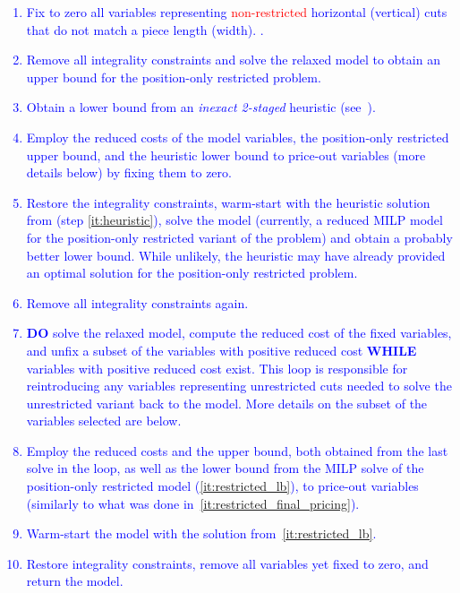 \documentclass[ppgc,tese,english,formais,babel]{iiufrgs}
\newif\iffinalversion
\newcommand{\newtext}[1]{\iffinalversion%
#1%
\else%
\textcolor{blue}{#1}%
\fi%
}
\newcommand{\oldtext}[1]{\iffinalversion%
\else%
\textcolor{red}{#1}%
\fi%
}
\begin{document}
\newtext{
\begin{enumerate}
\item Fix to zero all variables representing \oldtext{non-restricted}\newtext{horizontal (vertical)} cuts \newtext{that do not match a piece length (width).}.
\item Remove all integrality constraints and solve the relaxed model to obtain an upper bound for the \newtext{position-only} restricted problem.
\item Obtain a lower bound from an \emph{inexact 2-staged} heuristic (see~\cite{furini:2016,dolatabadi:2012}).\label{it:heuristic}
\item Employ the reduced costs of the model variables, the \newtext{position-only} restricted upper bound, and the heuristic lower bound to price-out variables (more details below) by fixing them to zero.\label{it:restricted_final_pricing}
\item Restore the integrality constraints, warm-start with the heuristic solution from (step \autoref{it:heuristic}), solve the model (currently, a reduced MILP model for the \newtext{position-only} restricted variant of the problem) and obtain a probably better lower bound. While unlikely, the heuristic may have already provided an optimal solution for the \newtext{position-only} restricted problem.\label{it:restricted_lb}
\item Remove all integrality constraints again.
\item \textbf{DO} solve the relaxed model, compute the reduced cost of the fixed variables, and unfix a subset of the variables with positive reduced cost \textbf{WHILE} variables with positive reduced cost exist. This loop is responsible for reintroducing any variables representing unrestricted cuts needed to solve the unrestricted variant back to the model. More details on the subset of the variables selected are below.\label{it:loop}
\item Employ the reduced costs and the upper bound, both obtained from the last solve in the loop, as well as the lower bound from the MILP solve of the \newtext{position-only} restricted model (\autoref{it:restricted_lb}), to price-out variables (similarly to what was done in~\autoref{it:restricted_final_pricing}).\label{it:final_pricing}
\item Warm-start the model with the solution from~\autoref{it:restricted_lb}.
\item Restore integrality constraints, remove all variables yet fixed to zero, and return the model.
\end{enumerate}
}
\end{document}
